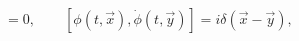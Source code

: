 \begin{equation}
[\phi(t,\vec{x}),\phi(t,\vec{y})]=0,\qquad 
[\phi(t,\vec{x}),\dot{\phi}(t,\vec{y})]=i\delta(\vec{x}-\vec{y}),
\label{CCR}
\end{equation}

